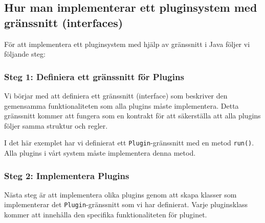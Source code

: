 \hypertarget{hur-man-implementerar-ett-pluginsystem-med-gruxe4nssnitt-interfaces}{%
\subsection{Hur man implementerar ett pluginsystem med gränssnitt
(interfaces)}\label{hur-man-implementerar-ett-pluginsystem-med-gruxe4nssnitt-interfaces}}

För att implementera ett pluginsystem med hjälp av gränssnitt i Java
följer vi följande steg:

\hypertarget{steg-1-definiera-ett-gruxe4nssnitt-fuxf6r-plugins}{%
\subsubsection{Steg 1: Definiera ett gränssnitt för
Plugins}\label{steg-1-definiera-ett-gruxe4nssnitt-fuxf6r-plugins}}

Vi börjar med att definiera ett gränssnitt (interface) som beskriver den
gemensamma funktionaliteten som alla plugins måste implementera. Detta
gränssnitt kommer att fungera som en kontrakt för att säkerställa att
alla plugins följer samma struktur och regler.

\hypertarget{cb1}{}
\begin{Shaded}
\begin{Highlighting}[]
 \OperatorTok{\{}
 \OperatorTok{();}
\OperatorTok{\}}
\end{Highlighting}
\end{Shaded}

I det här exemplet har vi definierat ett \texttt{Plugin}-gränssnitt med
en metod \texttt{run()}. Alla plugins i vårt system måste implementera
denna metod.

\hypertarget{steg-2-implementera-plugins}{%
\subsubsection{Steg 2: Implementera
Plugins}\label{steg-2-implementera-plugins}}

Nästa steg är att implementera olika plugins genom att skapa klasser som
implementerar det \texttt{Plugin}-gränssnitt som vi har definierat.
Varje pluginsklass kommer att innehålla den specifika funktionaliteten
för pluginet.

